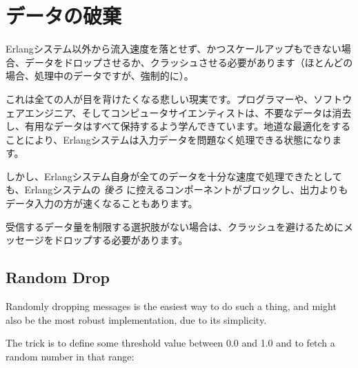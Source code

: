 \section{データの破棄}

Erlangシステム以外から流入速度を落とせず、かつスケールアップもできない場合、データをドロップさせるか、クラッシュさせる必要があります（ほとんどの場合、処理中のデータですが、強制的に）。

これは全ての人が目を背けたくなる悲しい現実です。プログラマーや、ソフトウェアエンジニア、そしてコンピュータサイエンティストは、不要なデータは消去し、有用なデータはすべて保持するよう学んできています。地道な最適化をすることにより、Erlangシステムは入力データを問題なく処理できる状態になります。

しかし、Erlangシステム自身が全てのデータを十分な速度で処理できたとしても、Erlangシステムの \emph{後ろ} に控えるコンポーネントがブロックし、出力よりもデータ入力の方が速くなることもあります。

受信するデータ量を制限する選択肢がない場合は、クラッシュを避けるためにメッセージをドロップする必要があります。

\subsection{Random Drop}

Randomly dropping messages is the easiest way to do such a thing, and might also be the most robust implementation, due to its simplicity.

The trick is to define some threshold value between 0.0 and 1.0 and to fetch a random number in that range:

